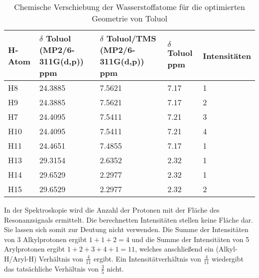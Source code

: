 \documentclass[12pt]{article}
\begin{document}
\begin{onehalfspace}
\begin{table}[!htpb]
\centering
\caption{Chemische Verschiebung der Wasserstoffatome für die optimierten Geometrie von Toluol}
\begin{tabular}{lllll}
\toprule
H-Atom  & \parbox[t]{4cm}{$\delta$ Toluol \\ (MP2/6-311G(d,p))\\ ppm} & \parbox[t]{4cm}{$\delta$ Toluol/TMS \\ (MP2/6-311G(d,p)) \\ ppm} &  \parbox[t]{4cm}{$\delta$ Toluol\cite{zeeh} ppm} & Intensitäten\\
\midrule
H8 & 24.3885  & 7.5621 & 7.17 & 1  \\
H9 & 24.3885  & 7.5621 & 7.17 & 2  \\
H7 & 24.4095  & 7.5411 & 7.21 & 3  \\
H10 & 24.4095 & 7.5411 & 7.21 & 4 \\
H11 & 24.4651 & 7.4855 & 7.17 & 1 \\
H13 & 29.3154 & 2.6352 & 2.32 & 1 \\
H14 & 29.6529 & 2.2977 & 2.32 & 1 \\
H15 & 29.6529 & 2.2977 & 2.32 & 2 \\
\bottomrule
\end{tabular}
\end{table}
\noindent
In der  Spektroskopie wird die Anzahl der Protonen mit der Fläche des Resonanzsignals ermittelt. Die berechnetten Intensitäten stellen keine Fläche dar. Sie lassen sich somit zur Deutung nicht verwenden. Die Summe der Intensitäten von 3 Alkylprotonen ergibt $1 + 1 + 2 = 4$  und die Summe der Intensitäten von 5 Arylprotonen ergibt $1+2+3+4+1 = 11 $, welches anschließend ein (Alkyl-H/Aryl-H) Verhältnis von $\frac{4}{11}$ ergibt. Ein Intensitätverhältnis von $\frac{4}{11}$ wiedergibt das tatsächliche Verhältnis von $\frac{3}{5}$ nicht.




\end{onehalfspace}
\end{document}
